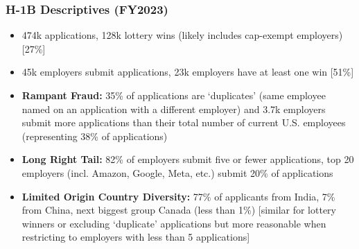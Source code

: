 \documentclass[xcolor=dvipsnames, compress, 12pt, aspectratio=169, handout]{beamer}
\begin{document}
\begin{frame}\label{h1bdesc}
    \frametitle{H-1B Descriptives (FY2023) \hyperlink{data}{}}
    \begin{itemize}
        \item 474k applications, 128k lottery wins (likely includes cap-exempt employers) [27\%]
        \item 45k employers submit applications, 23k employers have at least one win [51\%]
        \item \textbf{Rampant Fraud:} 35\% of applications are `duplicates' (same employee named on an application with a different employer) and 3.7k employers submit more applications than their total number of current U.S. employees (representing 38\% of applications)
        \item \textbf{Long Right Tail:} 82\% of employers submit five or fewer applications, top 20 employers (incl. Amazon, Google, Meta, etc.) submit 20\% of applications
        \item \textbf{Limited Origin Country Diversity:} 77\% of applicants from India, 7\% from China, next biggest group Canada (less than 1\%) [similar for lottery winners or excluding `duplicate' applications but more reasonable when restricting to employers with less than 5 applications]
    \end{itemize}    
\end{frame}
\end{document}
